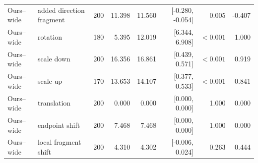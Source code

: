 \begin{center}
{\begin{tabular}{llrrrrrr}
Ours--wide & added direction fragment & 200 & 11.398 & 11.560 & [-0.280, -0.054] & 0.005 & -0.407 \\
Ours--wide & rotation & 180 & 5.395 & 12.019 & [6.344, 6.908] & \(<0.001\) & 1.000 \\
Ours--wide & scale down & 200 & 16.356 & 16.861 & [0.439, 0.571] & \(<0.001\) & 0.919 \\
Ours--wide & scale up & 170 & 13.653 & 14.107 & [0.377, 0.533] & \(<0.001\) & 0.841 \\
Ours--wide & translation & 200 & 0.000 & 0.000 & [0.000, 0.000] & 1.000 & 0.000 \\
Ours--wide & endpoint shift & 200 & 7.468 & 7.468 & [0.000, 0.000] & 1.000 & 0.000 \\
Ours--wide & local fragment shift & 200 & 4.310 & 4.302 & [-0.006, 0.024] & 0.263 & 0.444 \\
\bottomrule
\end{tabular}%
}
\end{center}

